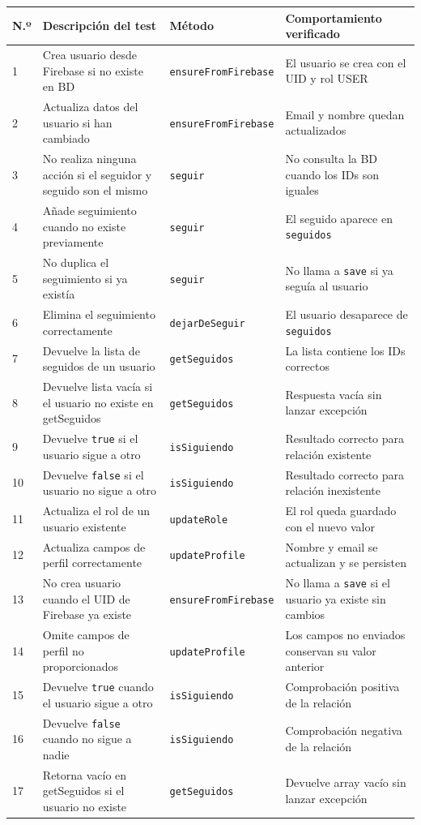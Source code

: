 \begin{longtable}{|p{0.5cm}|p{5.5cm}|p{3.8cm}|p{4.5cm}|}
\hline
\textbf{N.º} & \textbf{Descripción del test} & \textbf{Método} & \textbf{Comportamiento verificado} \\
\hline
1 & Crea usuario desde Firebase si no existe en BD & \texttt{ensureFromFirebase} & El usuario se crea con el UID y rol USER \\
\hline
2 & Actualiza datos del usuario si han cambiado & \texttt{ensureFromFirebase} & Email y nombre quedan actualizados \\
\hline
3 & No realiza ninguna acción si el seguidor y seguido son el mismo & \texttt{seguir} & No consulta la BD cuando los IDs son iguales \\
\hline
4 & Añade seguimiento cuando no existe previamente & \texttt{seguir} & El seguido aparece en \texttt{seguidos} \\
\hline
5 & No duplica el seguimiento si ya existía & \texttt{seguir} & No llama a \texttt{save} si ya seguía al usuario \\
\hline
6 & Elimina el seguimiento correctamente & \texttt{dejarDeSeguir} & El usuario desaparece de \texttt{seguidos} \\
\hline
7 & Devuelve la lista de seguidos de un usuario & \texttt{getSeguidos} & La lista contiene los IDs correctos \\
\hline
8 & Devuelve lista vacía si el usuario no existe en getSeguidos & \texttt{getSeguidos} & Respuesta vacía sin lanzar excepción \\
\hline
9 & Devuelve \texttt{true} si el usuario sigue a otro & \texttt{isSiguiendo} & Resultado correcto para relación existente \\
\hline
10 & Devuelve \texttt{false} si el usuario no sigue a otro & \texttt{isSiguiendo} & Resultado correcto para relación inexistente \\
\hline
11 & Actualiza el rol de un usuario existente & \texttt{updateRole} & El rol queda guardado con el nuevo valor \\
\hline
12 & Actualiza campos de perfil correctamente & \texttt{updateProfile} & Nombre y email se actualizan y se persisten \\
\hline
13 & No crea usuario cuando el UID de Firebase ya existe & \texttt{ensureFromFirebase} & No llama a \texttt{save} si el usuario ya existe sin cambios \\
\hline
14 & Omite campos de perfil no proporcionados & \texttt{updateProfile} & Los campos no enviados conservan su valor anterior \\
\hline
15 & Devuelve \texttt{true} cuando el usuario sigue a otro & \texttt{isSiguiendo} & Comprobación positiva de la relación \\
\hline
16 & Devuelve \texttt{false} cuando no sigue a nadie & \texttt{isSiguiendo} & Comprobación negativa de la relación \\
\hline
17 & Retorna vacío en getSeguidos si el usuario no existe & \texttt{getSeguidos} & Devuelve array vacío sin lanzar excepción \\
\hline
\end{longtable}

